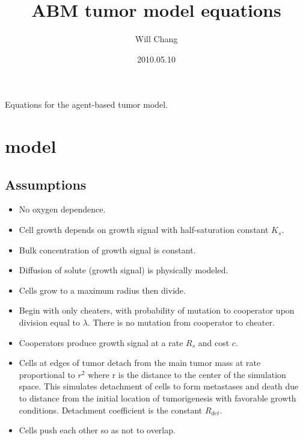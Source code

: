 \documentclass[11pt]{amsart}
\title{ABM tumor model equations}
\author{Will Chang}
\date{2010.05.10}
\begin{document}
	\maketitle
	Equations for the agent-based tumor model.

	\section{model}
		\subsection{Assumptions}
			\begin{flushleft}
				\begin{itemize}
					\item No oxygen dependence. \\
					\item Cell growth depends on growth signal with half-saturation constant \(K_s\). \\
					\item Bulk concentration of growth signal is constant. \\
					\item Diffusion of solute (growth signal) is physically modeled. \\
					\item Cells grow to a maximum radius then divide. \\
					\item Begin with only cheaters, with probability of mutation to cooperator upon division equal to \(\lambda\). There is no mutation from cooperator to cheater. \\
					\item Cooperators produce growth signal at a rate \(R_s\) and cost \(c\). \\
					\item Cells at edges of tumor detach from the main tumor mass at rate proportional to \(r^2\) where r is the distance to the center of the simulation space. This simulates detachment of cells to form metastases and death due to distance from the initial location of tumorigenesis with favorable growth conditions. Detachment coefficient is the constant \(R_{det}\). \\
					\item Cells push each other so as not to overlap. \\
				\end{itemize}
			\end{flushleft}
\end{document}
